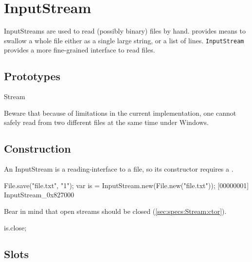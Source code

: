 
\section{InputStream}

InputStreams are used to read (possibly binary) files by hand.
 provides means to swallow a whole file either as a
single large string, or a list of lines.  \lstinline|InputStream|
provides a more fine-grained interface to read files.

\subsection{Prototypes}
\begin{refObjects}
\item[Stream]
\end{refObjects}

\begin{windows}
  Beware that because of limitations in the current implementation,
  one cannot safely read from two different files at the same time
  under Windows.
\end{windows}

\subsection{Construction}

An InputStream is a reading-interface to a file, so its constructor
requires a .

\begin{urbiscript}[firstnumber=1]
File.save("file.txt", "1\n");
var is = InputStream.new(File.new("file.txt"));
[00000001] InputStream_0x827000
\end{urbiscript}

Bear in mind that open streams should be closed
(\autoref{sec:specs:Stream:ctor}).

\begin{urbiscript}
is.close;
\end{urbiscript}

\subsection{Slots}

